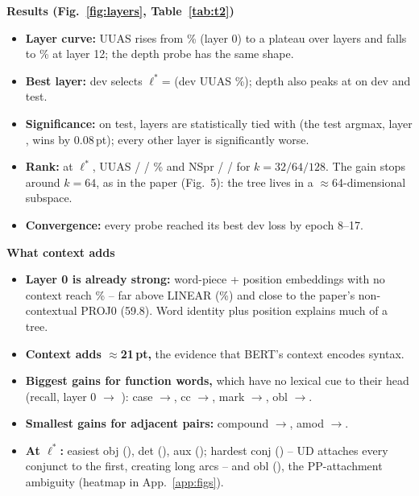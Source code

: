 \documentclass[11pt,a4paper]{article}
\newcommand{\lstar}{\ensuremath{\ell^*}}
\newcommand{\pt}{\,pt}
\newcommand{\blk}[1]{\par\needspace{5\baselineskip}\smallskip\noindent\textbf{#1}\par\nobreak\vspace{1pt}}
\begin{document}
\begin{table}[t]\centering\footnotesize\setlength{\tabcolsep}{4.2pt}
\caption{Task 2 on EWT test, all layers and ranks. DSpr/Root\% use the dev-best rank of the layer. The $\Delta$ column is a
paired bootstrap of each layer vs.\ \lstar{} over the same sentences; $^\dagger$ = 95\% CI contains 0 (not significantly
different). Shaded: \lstar.}\label{tab:t2}\end{table}

\blk{Results (Fig.~\ref{fig:layers}, Table~\ref{tab:t2})}
\begin{itemize}
\item \textbf{Layer curve:} UUAS rises from \LzeroUUAS\% (layer 0) to a plateau over layers \TiedLayers{} and falls to \LtwelveUUAS\%
at layer 12; the depth probe has the same shape.
\item \textbf{Best layer:} dev selects \lstar=\Lstar{} (dev UUAS \TtwoDevUuas\%); depth also peaks at \Lstar{} on dev and test.
\item \textbf{Significance:} on test, layers \TiedLayers{} are statistically tied with \Lstar{} (the test argmax, layer \TtwoTestArgmax,
wins by 0.08\pt); every other layer is significantly worse.
\item \textbf{Rank:} at \lstar, UUAS \RankAUUAS{} / \RankBUUAS{} / \RankCUUAS\% and NSpr \RankANSpr{} / \RankBNSpr{} / \RankCNSpr{}
for $k=32/64/128$. The gain stops around $k=64$, as in the paper (Fig.~5): the tree lives in a $\approx$64-dimensional subspace.
\item \textbf{Convergence:} every probe reached its best dev loss by epoch 8--17.
\end{itemize}

\blk{What context adds}
\begin{itemize}
\item \textbf{Layer 0 is already strong:} word-piece + position embeddings with no context reach \LzeroUUAS\% -- far above LINEAR
(\LinUUAS\%) and close to the paper's non-contextual PROJ0 (59.8). Word identity plus position explains much of a tree.
\item \textbf{Context adds $\approx$21\pt,} the evidence that BERT's context encodes syntax.
\item \textbf{Biggest gains for function words,} which have no lexical cue to their head (recall, layer 0 $\to$ \Lstar): case
\PRelZeroCase$\to$\PRelCase, cc \PRelZeroCc$\to$\PRelCc, mark \PRelZeroMark$\to$\PRelMark, obl \PRelZeroObl$\to$\PRelObl.
\item \textbf{Smallest gains for adjacent pairs:} compound \PRelZeroCompound$\to$\PRelCompound, amod \PRelZeroAmod$\to$\PRelAmod.
\item \textbf{At \lstar:} easiest obj (\PRelObj), det (\PRelDet), aux (\PRelAux); hardest conj (\PRelConj) -- UD attaches every
conjunct to the first, creating long arcs -- and obl (\PRelObl), the PP-attachment ambiguity (heatmap in App.~\ref{app:figs}).
\end{itemize}
\end{document}

